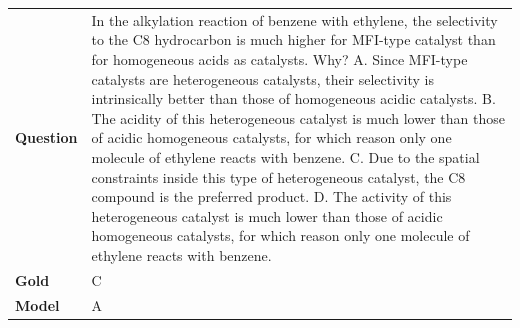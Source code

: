 \begin{longtable}{@{}l p{13cm}@{}}
  \textbf{Question}  & In the alkylation reaction of benzene with ethylene, the selectivity to the C8 hydrocarbon is much higher for MFI-type catalyst than for homogeneous acids as catalysts. Why? \newline A. Since MFI-type catalysts are heterogeneous catalysts, their selectivity is intrinsically better than those of homogeneous acidic catalysts. \newline B. The acidity of this heterogeneous catalyst is much lower than those of acidic homogeneous catalysts, for which reason only one molecule of ethylene reacts with benzene. \newline C. Due to the spatial constraints inside this type of heterogeneous catalyst, the C8 compound is the preferred product. \newline D. The activity of this heterogeneous catalyst is much lower than those of acidic homogeneous catalysts, for which reason only one molecule of ethylene reacts with benzene.   \\
  \textbf{Gold}      & C       \\
  \textbf{Model}     & A  \\

\end{longtable}
